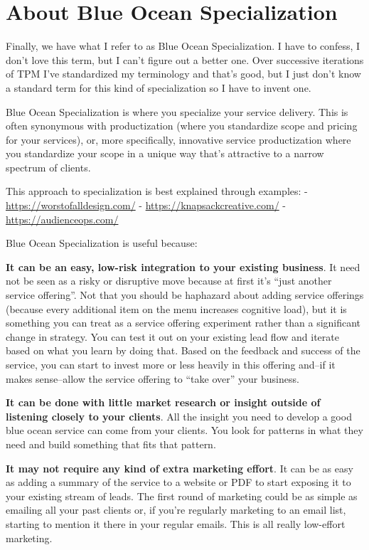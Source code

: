 \section{About Blue Ocean Specialization}

Finally, we have what I refer to as Blue Ocean Specialization. I have to confess, I don't love this term, but I can't figure out a better one. Over successive iterations of TPM I've standardized my terminology and that's good, but I just don't know a standard term for this kind of specialization so I have to invent one.

Blue Ocean Specialization is where you specialize your service delivery. This is often synonymous with productization (where you standardize scope and pricing for your services), or, more specifically, innovative service productization where you standardize your scope in a unique way that's attractive to a narrow spectrum of clients.

This approach to specialization is best explained through examples:
- \href{https://worstofalldesign.com/}{https://worstofalldesign.com/}
- \href{https://knapsackcreative.com/}{https://knapsackcreative.com/}
- \href{https://audienceops.com/}{https://audienceops.com/}

Blue Ocean Specialization is useful because:

\textbf{It can be an easy, low-risk integration to your existing business}. It need not be seen as a risky or disruptive move because at first it's ``just another service offering''. Not that you should be haphazard about adding service offerings (because every additional item on the menu increases cognitive load), but it is something you can treat as a service offering experiment rather than a significant change in strategy. You can test it out on your existing lead flow and iterate based on what you learn by doing that. Based on the feedback and success of the service, you can start to invest more or less heavily in this offering and--if it makes sense--allow the service offering to ``take over'' your business.

\textbf{It can be done with little market research or insight outside of listening closely to your clients}. All the insight you need to develop a good blue ocean service can come from your clients. You look for patterns in what they need and build something that fits that pattern.

\textbf{It may not require any kind of extra marketing effort}. It can be as easy as adding a summary of the service to a website or PDF to start exposing it to your existing stream of leads. The first round of marketing could be as simple as emailing all your past clients or, if you're regularly marketing to an email list, starting to mention it there in your regular emails. This is all really low-effort marketing.

